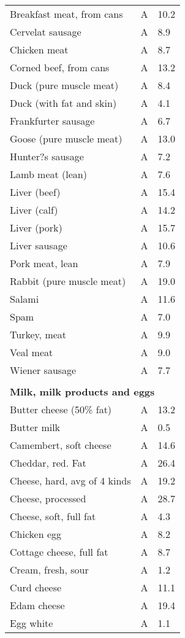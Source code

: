 \documentclass[../main.tex]{subfiles}
\begin{document}
\begin{longtable}{p{7cm}p{0.5cm}p{1cm}}
Breakfast meat, from cans  & A  & 10.2 \\
Cervelat sausage  & A  & 8.9 \\
Chicken meat  & A  & 8.7 \\
Corned beef, from cans  & A  & 13.2 \\
Duck (pure muscle meat)  & A  & 8.4 \\
Duck (with fat and skin)  & A  & 4.1 \\
Frankfurter sausage  & A  & 6.7 \\
Goose (pure muscle meat)  & A  & 13.0 \\
Hunter?s sausage  & A  & 7.2 \\
Lamb meat (lean)  & A  & 7.6 \\
Liver (beef)  & A  & 15.4 \\
Liver (calf)  & A  & 14.2 \\
Liver (pork)  & A  & 15.7 \\
Liver sausage  & A  & 10.6 \\
Pork meat, lean  & A  & 7.9 \\
Rabbit (pure muscle meat)  & A  & 19.0 \\
Salami  & A  & 11.6 \\
Spam  & A  & 7.0 \\
Turkey, meat  & A  & 9.9 \\
Veal meat  & A  & 9.0 \\
Wiener sausage  & A  & 7.7 \\
 \\
\multicolumn{3}{l}{\textbf{Milk, milk products and eggs}}  \\
Butter cheese (50\% fat)  & A  & 13.2 \\
Butter milk  & A  & 0.5 \\
Camembert, soft cheese  & A  & 14.6 \\
Cheddar, red. Fat  & A  & 26.4 \\
Cheese, hard, avg of 4 kinds  & A  & 19.2 \\
Cheese, processed  & A  & 28.7 \\
Cheese, soft, full fat  & A  & 4.3 \\
Chicken egg  & A  & 8.2 \\
Cottage cheese, full fat  & A  & 8.7 \\
Cream, fresh, sour  & A  & 1.2 \\
Curd cheese  & A  & 11.1 \\
Edam cheese  & A  & 19.4 \\
Egg white   & A  & 1.1 \\

\end{longtable}
\end{document}
